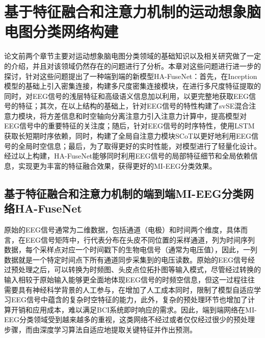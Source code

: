 
\chapter{基于特征融合和注意力机制的运动想象脑电图分类网络构建}

论文前两个章节主要对运动想象脑电图分类领域的基础知识以及相关研究做了一定的介绍，并且对该领域仍然存在的问题进行了分析。本章对这些问题进行进一步的探讨，针对这些问题提出了一种端到端的新模型HA-FuseNet：首先，在Inception模型的基础上引入密集连接，构建多尺度密集连接模块，在进行多尺度特征提取的同时，对EEG信号的浅层特征和高级语义信息加以利用，以更完整地获取EEG信号的特征；其次，在以上结构的基础上，针对EEG信号的特性构建了svSE混合注意力模块，将方差信息和时空轴向分离注意力引入注意力计算中，提高模型对EEG信号中的重要特征的关注度；随后，针对EEG信号的时序特性，使用LSTM获取长短期时序依赖，同时，构建了全局自注意力模块SCoT以更好地利用EEG信号的全局时空信息；最后，为了取得更好的实时性能，对模型进行了轻量化设计。经过以上构建，HA-FuseNet能够同时利用EEG信号的局部特征细节和全局依赖信息，实现更为丰富的特征融合效果，获得更好的MI-EEG分类效果。

\section{基于特征融合和注意力机制的端到端MI-EEG分类网络HA-FuseNet}

原始的EEG信号通常为二维数据，包括通道（电极）和时间两个维度，具体而言，在EEG信号矩阵中，行代表分布在头皮不同位置的采样通道，列为时间序列数据，每个采样点对应一个时间戳下的生物电信号（通常为电压值），因此，一列数据就是一个特定时间点下所有通道同步采集到的电压读数。原始的EEG信号经过预处理之后，可以转换为时频图、头皮点位拓扑图等输入模式，尽管经过转换的输入相较于原始输入能够更全面地体现EEG信号的时频空信息，但这一过程往往需要具有神经科学背景的人工参与，在增加了人工成本同时，限制了模型自适应学习EEG信号中蕴含的复杂时空特征的能力，此外，复杂的预处理环节也增加了计算开销和应用成本，难以满足BCI系统即时响应的需求。因此，端到端网络在MI-EEG分类领域受到越来越多的重视，这类网络不经过或者仅仅经过很少的预处理步骤，而由深度学习算法自适应地提取关键特征并作出预测。

